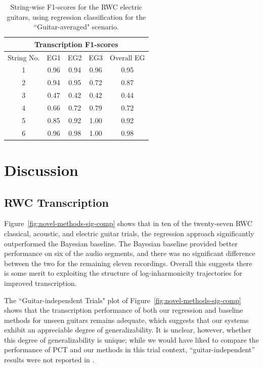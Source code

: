 \documentclass[convention,peer-reviewed]{aesconf}
\begin{document}
\begin{table}[!h]
\begin{center}
\begin{tabular}{||c||c|c|c|c||}
\hline
\multicolumn{5}{||c||}{\bf{Transcription F1-scores}} \\
\hline
String No. & EG1 & EG2 & EG3 & Overall EG\\
\hline
1 & 0.96 & 0.94 & 0.96 & 0.95 \\
\hline
2 & 0.94 & 0.95 & 0.72 & 0.87\\
\hline
3 & 0.47 & 0.42 & 0.42 &  0.44\\
\hline
4 & 0.66 & 0.72 & 0.79 &  0.72\\
\hline
5 & 0.85 & 0.92 & 1.00 &  0.92 \\
\hline
6 & 0.96 & 0.98 & 1.00 &  0.98 \\ 
\hline
\hline
\end{tabular}
\caption{String-wise F1-scores for the RWC electric guitars, using regression classification for the ``Guitar-averaged" scenario.} 
\label{tab:eg-str-f}
\end{center}
\end{table}

\section{Discussion} 
\subsection{RWC Transcription}
Figure~\ref{fig:novel-methods-sig-comp} shows that in ten of the twenty-seven RWC classical, acoustic, and electric guitar trials, the regression approach significantly outperformed the Bayesian baseline. The Bayesian baseline provided better performance on six of the audio segments, and there was no significant difference between the two for the remaining eleven recordings. Overall this suggests there is some merit to exploiting the structure of log-inharmonicity trajectories for improved transcription.

The ``Guitar-independent Trials" plot of Figure~\ref{fig:novel-methods-sig-comp} shows that the transcription performance of both our regression and baseline methods for unseen guitars remains adequate, which suggests that our systems exhibit an appreciable degree of generalizability. It is unclear, however, whether this degree of generalizability is unique; while we would have liked to compare the performance of PCT and our methods in this trial context, ``guitar-independent'' results were not reported in \citep{barbanchoi2012}.
\end{document}
